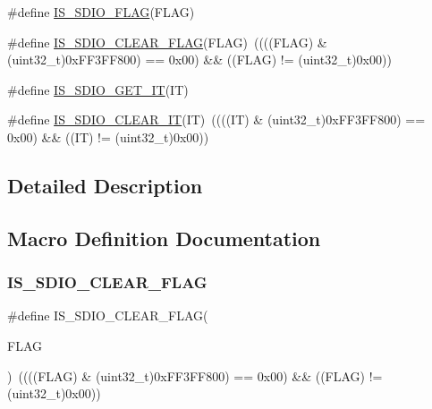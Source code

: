 \begin{DoxyCompactItemize}
\item 
\#define \hyperlink{group___s_d_i_o___flags_ga04b3c3c316e112172abacbf5e316f24a}{I\+S\+\_\+\+S\+D\+I\+O\+\_\+\+F\+L\+AG}(F\+L\+AG)
\item 
\#define \hyperlink{group___s_d_i_o___flags_ga8a093bc0b51901676fd5da7087d8ab3a}{I\+S\+\_\+\+S\+D\+I\+O\+\_\+\+C\+L\+E\+A\+R\+\_\+\+F\+L\+AG}(F\+L\+AG)~((((F\+L\+AG) \& (uint32\+\_\+t)0x\+F\+F3\+F\+F800) == 0x00) \&\& ((\+F\+L\+A\+G) != (uint32\+\_\+t)0x00))
\item 
\#define \hyperlink{group___s_d_i_o___flags_gaef42c81f1f6250d8f9f438f4e16d1e98}{I\+S\+\_\+\+S\+D\+I\+O\+\_\+\+G\+E\+T\+\_\+\+IT}(IT)
\item 
\#define \hyperlink{group___s_d_i_o___flags_gaf829b01d8c3e9a1e4e04d39abdc8c355}{I\+S\+\_\+\+S\+D\+I\+O\+\_\+\+C\+L\+E\+A\+R\+\_\+\+IT}(IT)~((((IT) \& (uint32\+\_\+t)0x\+F\+F3\+F\+F800) == 0x00) \&\& ((\+I\+T) != (uint32\+\_\+t)0x00))
\end{DoxyCompactItemize}


\subsection{Detailed Description}


\subsection{Macro Definition Documentation}
\mbox{\label{group___s_d_i_o___flags_ga8a093bc0b51901676fd5da7087d8ab3a}} 
\subsubsection{\texorpdfstring{I\+S\+\_\+\+S\+D\+I\+O\+\_\+\+C\+L\+E\+A\+R\+\_\+\+F\+L\+AG}{IS\_SDIO\_CLEAR\_FLAG}}
{\footnotesize\ttfamily \#define I\+S\+\_\+\+S\+D\+I\+O\+\_\+\+C\+L\+E\+A\+R\+\_\+\+F\+L\+AG(\begin{DoxyParamCaption}\item[{}]{F\+L\+AG }\end{DoxyParamCaption})~((((F\+L\+AG) \& (uint32\+\_\+t)0x\+F\+F3\+F\+F800) == 0x00) \&\& ((\+F\+L\+A\+G) != (uint32\+\_\+t)0x00))}



